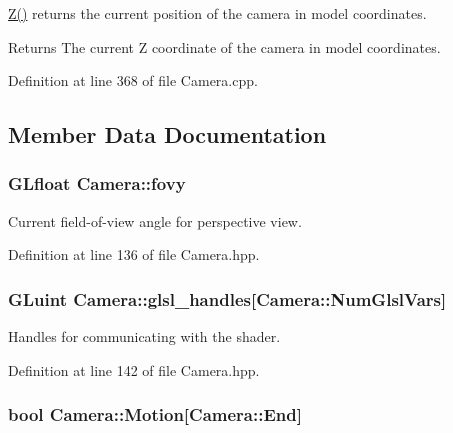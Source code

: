 \hyperlink{class_camera_abf1730e47e8e51c76acbddcaa85e2475}{\-Z()} returns the current position of the camera in model coordinates. 

\begin{DoxyReturn}{\-Returns}
\-The current \-Z coordinate of the camera in model coordinates. 
\end{DoxyReturn}


\-Definition at line 368 of file \-Camera.\-cpp.



\subsection{\-Member \-Data \-Documentation}
\hypertarget{class_camera_acc8b97facc57059530efad534c2f8314}{
\subsubsection[{fovy}]{\setlength{\rightskip}{0pt plus 5cm}\-G\-Lfloat {\bf \-Camera\-::fovy}}}\label{class_camera_acc8b97facc57059530efad534c2f8314}


\-Current field-\/of-\/view angle for perspective view. 



\-Definition at line 136 of file \-Camera.\-hpp.

\hypertarget{class_camera_a1635486d7f9e0d52b241899a270ee335}{
\subsubsection[{glsl\-\_\-handles}]{\setlength{\rightskip}{0pt plus 5cm}\-G\-Luint {\bf \-Camera\-::glsl\-\_\-handles}\mbox{[}\-Camera\-::\-Num\-Glsl\-Vars\mbox{]}}}\label{class_camera_a1635486d7f9e0d52b241899a270ee335}


\-Handles for communicating with the shader. 



\-Definition at line 142 of file \-Camera.\-hpp.

\hypertarget{class_camera_a39746b4fadf30bba6bdc8aa6acfdc6f2}{
\subsubsection[{\-Motion}]{\setlength{\rightskip}{0pt plus 5cm}bool {\bf \-Camera\-::\-Motion}\mbox{[}\-Camera\-::\-End\mbox{]}}}\label{class_camera_a39746b4fadf30bba6bdc8aa6acfdc6f2}



